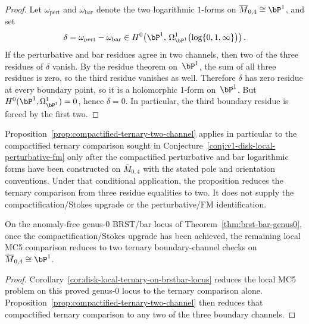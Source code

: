 \begin{proof}
Let $\omega_{\mathrm{pert}}$ and $\omega_{\mathrm{bar}}$ denote the two
logarithmic $1$-forms on $\overline{M}_{0,4} \cong \bP^1$, and set
\[
\delta = \omega_{\mathrm{pert}} - \omega_{\mathrm{bar}}
\in H^0\!\left(\bP^1,\,
\Omega^1_{\bP^1}\bigl(\log\{0,1,\infty\}\bigr)\right).
\]
If the perturbative and bar residues agree in two channels, then two of
the three residues of $\delta$ vanish. By the residue theorem on~$\bP^1$,
the sum of all three residues is zero, so the third residue vanishes as
well. Therefore $\delta$ has zero residue at every boundary point, so
it is a holomorphic $1$-form on~$\bP^1$. But
$H^0(\bP^1,\Omega^1_{\bP^1}) = 0$, hence $\delta = 0$.
In particular, the third boundary residue is forced by the first two.
\end{proof}

\begin{remark}
Proposition~\ref{prop:compactified-ternary-two-channel} applies in
particular to the compactified ternary comparison sought in
Conjecture~\ref{conj:v1-disk-local-perturbative-fm} only after the
compactified perturbative and bar logarithmic forms have been
constructed on $\overline{M}_{0,4}$ with the stated pole and
orientation conventions. Under that conditional application, the
proposition reduces the ternary comparison from three residue
equalities to two. It does not supply the compactification/Stokes
upgrade or the perturbative/FM identification.
\end{remark}

\begin{corollary}
\label{cor:genus0-compactified-ternary-two-channel}
On the anomaly-free genus-$0$ BRST/bar locus of
Theorem~\ref{thm:brst-bar-genus0}, once the compactification/Stokes
upgrade has been achieved, the remaining local MC5 comparison reduces
to two ternary boundary-channel checks on
$\overline{M}_{0,4} \cong \bP^1$.
\end{corollary}

\begin{proof}
Corollary~\ref{cor:disk-local-ternary-on-brstbar-locus} reduces the
local MC5 problem on this proved genus-$0$ locus to the ternary comparison
alone. Proposition~\ref{prop:compactified-ternary-two-channel} then
reduces that compactified ternary comparison to any two of the three
boundary channels.
\end{proof}

